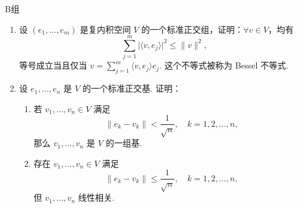\centerline{\heiti B组}
\begin{enumerate}
    \item 设 $ (e_1, \ldots , e_m) $ 是复内积空间 $ V $ 的一个标准正交组，证明：$ \forall v \in V $，均有
          \[ \sum_{j = 1}^{m} \lvert \langle v, e_j \rangle \rvert^2 \leqslant \lVert v \rVert^2, \]
          等号成立当且仅当 $ v = \displaystyle\sum_{j = 1}^{m} \langle v, e_j \rangle e_j $. 这个不等式被称为 Bessel 不等式.
    \item 设 $e_1, \ldots, e_n$ 是 $V$ 的一个标准正交基. 证明：
          \begin{enumerate}
            \item 若 $v_1, \ldots, v_n \in V$ 满足
                  \[
                    \lVert e_k - v_k \rVert < \dfrac{1}{\sqrt{n}}, \quad k = 1, 2, \ldots, n,
                  \]
                  那么 $v_1, \ldots, v_n$ 是 $V$ 的一组基.
            \item 存在 $v_1, \ldots, v_n \in V$ 满足
                  \[
                    \lVert e_k - v_k \rVert \leqslant \dfrac{1}{\sqrt{n}}, \quad k = 1, 2, \ldots, n,
                  \]
                  但 $v_1, \ldots, v_n$ 线性相关.
          \end{enumerate}
\end{enumerate}

